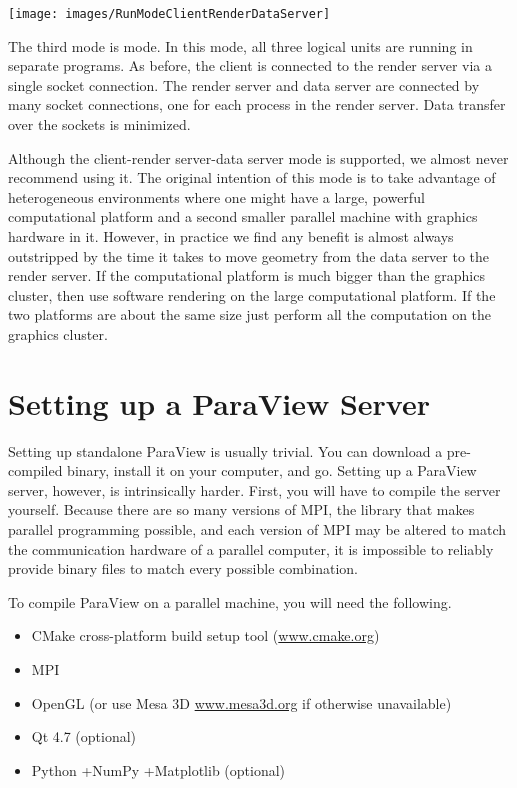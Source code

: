 \begin{inlinefig}
  \texttt{[image: images/RunModeClientRenderDataServer]}
\end{inlinefig}

The third mode is  mode.  In this
mode, all three logical units are running in separate programs.  As before,
the client is connected to the render server via a single socket
connection.  The render server and data server are connected by many socket
connections, one for each process in the render server.  Data transfer over
the sockets is minimized.

Although the client-render server-data server mode is supported, we almost
never recommend using it.  The original intention of this mode is to take
advantage of heterogeneous environments where one might have a large,
powerful computational platform and a second smaller parallel machine with
graphics hardware in it.  However, in practice we find any benefit is
almost always outstripped by the time it takes to move geometry from the
data server to the render server.  If the computational platform is much
bigger than the graphics cluster, then use software rendering on the large
computational platform.  If the two platforms are about the same size just
perform all the computation on the graphics cluster.

\section{Setting up a ParaView Server}

Setting up standalone ParaView is usually trivial.  You can download a
pre-compiled binary, install it on your computer, and go.  Setting up a
ParaView server, however, is intrinsically harder.  First, you will have to
compile the server yourself.  Because there are so many versions of MPI,
the library that makes parallel programming possible, and each version of
MPI may be altered to match the communication hardware of a parallel
computer, it is impossible to reliably provide binary files to match every
possible combination.

To compile ParaView on a parallel machine, you will need the following.

\begin{itemize}
\item CMake cross-platform build setup tool
  (\href{http://www.cmake.org}{www.cmake.org})
\item MPI
\item OpenGL (or use Mesa 3D \href{http://www.mesa3d.org}{www.mesa3d.org}
  if otherwise unavailable)
\item Qt 4.7 (optional)
\item Python +NumPy +Matplotlib (optional)
\end{itemize}

